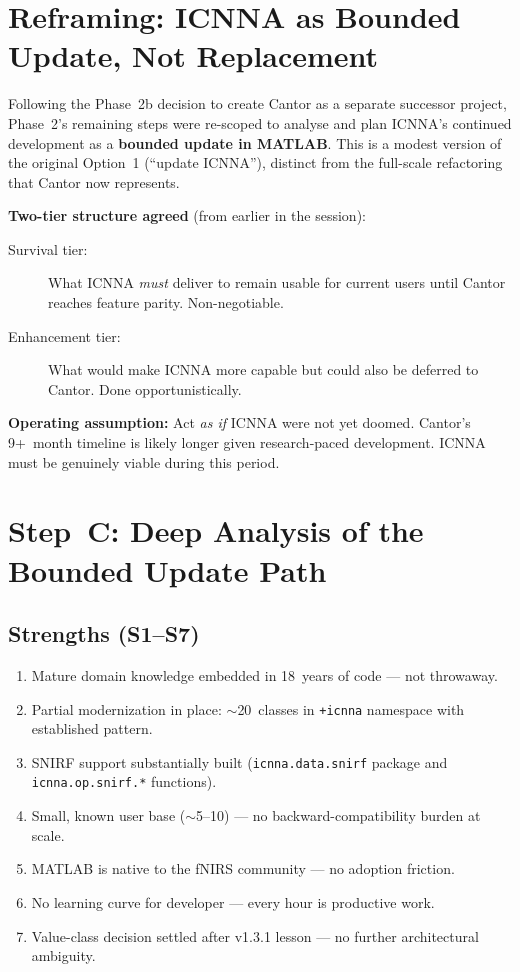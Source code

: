 \documentclass[11pt,a4paper]{article}
\begin{document}
\section{Reframing: ICNNA as Bounded Update, Not Replacement}

Following the Phase~2b decision to create Cantor as a separate successor project, Phase~2's remaining steps were re-scoped to analyse and plan ICNNA's continued development as a \textbf{bounded update in MATLAB}. This is a modest version of the original Option~1 (``update ICNNA''), distinct from the full-scale refactoring that Cantor now represents.

\textbf{Two-tier structure agreed} (from earlier in the session):

\begin{description}
    \item[Survival tier:] What ICNNA \emph{must} deliver to remain usable for current users until Cantor reaches feature parity. Non-negotiable.
    \item[Enhancement tier:] What would make ICNNA more capable but could also be deferred to Cantor. Done opportunistically.
\end{description}

\textbf{Operating assumption:} Act \emph{as if} ICNNA were not yet doomed. Cantor's 9+~month timeline is likely longer given research-paced development. ICNNA must be genuinely viable during this period.

\section{Step~C: Deep Analysis of the Bounded Update Path}

\subsection{Strengths (S1--S7)}

\begin{enumerate}[label=\textbf{S\arabic*.}]
    \item Mature domain knowledge embedded in 18~years of code --- not throwaway.
    \item Partial modernization in place: $\sim$20~classes in \texttt{+icnna} namespace with established pattern.
    \item SNIRF support substantially built (\texttt{icnna.data.snirf} package and \texttt{icnna.op.snirf.*} functions).
    \item Small, known user base ($\sim$5--10) --- no backward-compatibility burden at scale.
    \item MATLAB is native to the fNIRS community --- no adoption friction.
    \item No learning curve for developer --- every hour is productive work.
    \item Value-class decision settled after v1.3.1 lesson --- no further architectural ambiguity.
\end{enumerate}
\end{document}
